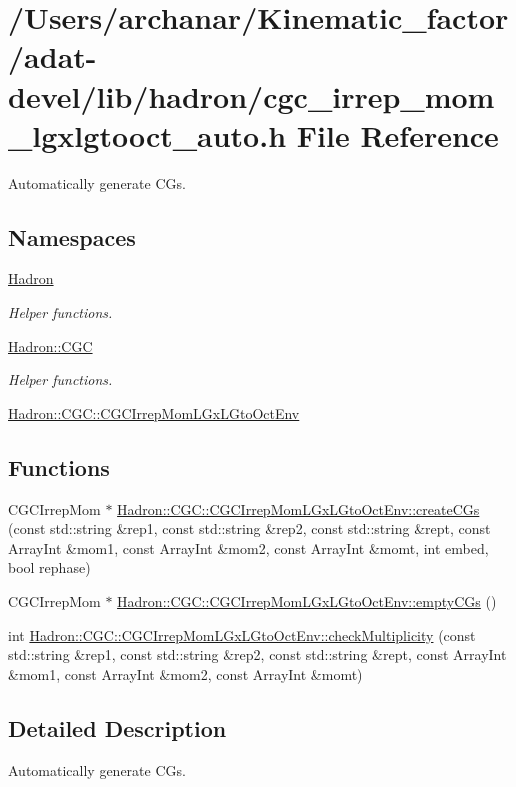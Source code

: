 \hypertarget{adat-devel_2lib_2hadron_2cgc__irrep__mom__lgxlgtooct__auto_8h}{}\section{/\+Users/archanar/\+Kinematic\+\_\+factor/adat-\/devel/lib/hadron/cgc\+\_\+irrep\+\_\+mom\+\_\+lgxlgtooct\+\_\+auto.h File Reference}
\label{adat-devel_2lib_2hadron_2cgc__irrep__mom__lgxlgtooct__auto_8h}


Automatically generate C\+Gs.  


\subsection*{Namespaces}
\begin{DoxyCompactItemize}
\item 
 \mbox{\hyperlink{namespaceHadron}{Hadron}}
\begin{DoxyCompactList}\small\item\em Helper functions. \end{DoxyCompactList}\item 
 \mbox{\hyperlink{namespaceHadron_1_1CGC}{Hadron\+::\+C\+GC}}
\begin{DoxyCompactList}\small\item\em Helper functions. \end{DoxyCompactList}\item 
 \mbox{\hyperlink{namespaceHadron_1_1CGC_1_1CGCIrrepMomLGxLGtoOctEnv}{Hadron\+::\+C\+G\+C\+::\+C\+G\+C\+Irrep\+Mom\+L\+Gx\+L\+Gto\+Oct\+Env}}
\end{DoxyCompactItemize}
\subsection*{Functions}
\begin{DoxyCompactItemize}
\item 
C\+G\+C\+Irrep\+Mom $\ast$ \mbox{\hyperlink{namespaceHadron_1_1CGC_1_1CGCIrrepMomLGxLGtoOctEnv_a326be3440106df05ce61c23e713f7312}{Hadron\+::\+C\+G\+C\+::\+C\+G\+C\+Irrep\+Mom\+L\+Gx\+L\+Gto\+Oct\+Env\+::create\+C\+Gs}} (const std\+::string \&rep1, const std\+::string \&rep2, const std\+::string \&rept, const Array\+Int \&mom1, const Array\+Int \&mom2, const Array\+Int \&momt, int embed, bool rephase)
\item 
C\+G\+C\+Irrep\+Mom $\ast$ \mbox{\hyperlink{namespaceHadron_1_1CGC_1_1CGCIrrepMomLGxLGtoOctEnv_afd66508df18d3aba9ecfc7d3ad09e448}{Hadron\+::\+C\+G\+C\+::\+C\+G\+C\+Irrep\+Mom\+L\+Gx\+L\+Gto\+Oct\+Env\+::empty\+C\+Gs}} ()
\item 
int \mbox{\hyperlink{namespaceHadron_1_1CGC_1_1CGCIrrepMomLGxLGtoOctEnv_aa39bf5f462bddb44a91da07a903947f4}{Hadron\+::\+C\+G\+C\+::\+C\+G\+C\+Irrep\+Mom\+L\+Gx\+L\+Gto\+Oct\+Env\+::check\+Multiplicity}} (const std\+::string \&rep1, const std\+::string \&rep2, const std\+::string \&rept, const Array\+Int \&mom1, const Array\+Int \&mom2, const Array\+Int \&momt)
\end{DoxyCompactItemize}


\subsection{Detailed Description}
Automatically generate C\+Gs. 

